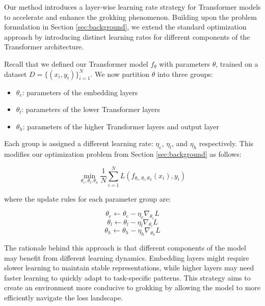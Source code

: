 \documentclass{article} %
\begin{document}
Our method introduces a layer-wise learning rate strategy for Transformer models to accelerate and enhance the grokking phenomenon. Building upon the problem formulation in Section \ref{sec:background}, we extend the standard optimization approach by introducing distinct learning rates for different components of the Transformer architecture.

Recall that we defined our Transformer model $f_\theta$ with parameters $\theta$, trained on a dataset $D = \{(x_i, y_i)\}_{i=1}^{N}$. We now partition $\theta$ into three groups:

\begin{itemize}
    \item $\theta_e$: parameters of the embedding layers
    \item $\theta_l$: parameters of the lower Transformer layers
    \item $\theta_h$: parameters of the higher Transformer layers and output layer
\end{itemize}

Each group is assigned a different learning rate: $\eta_e$, $\eta_l$, and $\eta_h$ respectively. This modifies our optimization problem from Section \ref{sec:background} as follows:

\begin{equation}
    \min_{\theta_e, \theta_l, \theta_h} \frac{1}{N} \sum_{i=1}^N L(f_{\theta_e, \theta_l, \theta_h}(x_i), y_i)
\end{equation}

where the update rules for each parameter group are:

\begin{equation}
    \theta_e \leftarrow \theta_e - \eta_e \nabla_{\theta_e} L
\end{equation}
\begin{equation}
    \theta_l \leftarrow \theta_l - \eta_l \nabla_{\theta_l} L
\end{equation}
\begin{equation}
    \theta_h \leftarrow \theta_h - \eta_h \nabla_{\theta_h} L
\end{equation}

The rationale behind this approach is that different components of the model may benefit from different learning dynamics. Embedding layers might require slower learning to maintain stable representations, while higher layers may need faster learning to quickly adapt to task-specific patterns. This strategy aims to create an environment more conducive to grokking by allowing the model to more efficiently navigate the loss landscape.
\end{document}
